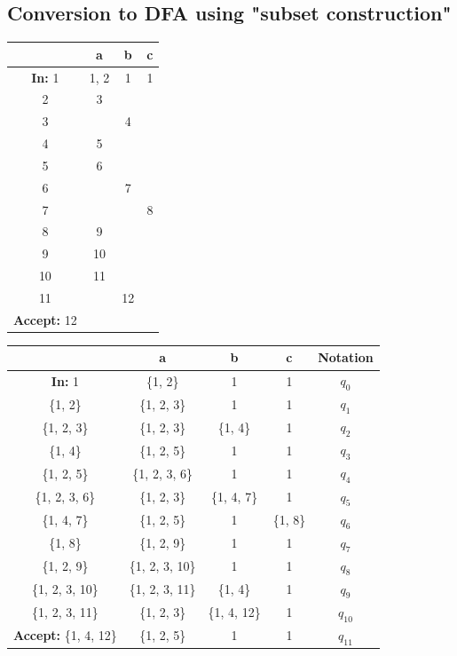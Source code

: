 \documentclass[12pt]{article}
\begin{document}
\subsection{Conversion to DFA using "subset construction"}

\begin{center}
  \begin{tabular}{|c|c|c|c|}
    \hline
     & a & b & c \\
    \hline
    \textbf{In:} 1 & 1, 2 & 1 & 1 \\
    \hline
    2 & 3 &  & \\
    \hline
    3 &  & 4 & \\
    \hline
    4 & 5 &  & \\
    \hline
    5 & 6 &  & \\
    \hline
    6 &  & 7 & \\
    \hline
    7 &  &  & 8 \\
    \hline
    8 & 9 &  & \\
    \hline
    9 & 10 &  & \\
    \hline
    10 & 11 &  & \\
    \hline
    11 &  & 12 & \\
    \hline
    \textbf{Accept:} 12 &  &  & \\
    \hline
  \end{tabular}
\end{center}

\begin{center}
  \begin{tabular}{|c|c|c|c|c|}
    \hline
     & a & b & c & Notation\\
    \hline
    \textbf{In:} 1 & \{1, 2\} & 1 & 1 & $q_0$ \\
    \hline
    \{1, 2\} & \{1, 2, 3\} & 1 & 1 & $q_1$ \\
    \hline
    \{1, 2, 3\} & \{1, 2, 3\} & \{1, 4\} & 1 & $q_2$ \\
    \hline
    \{1, 4\} & \{1, 2, 5\} & 1 & 1 & $q_3$ \\
    \hline
    \{1, 2, 5\} & \{1, 2, 3, 6\} & 1 & 1 & $q_4$ \\
    \hline
    \{1, 2, 3, 6\} & \{1, 2, 3\} & \{1, 4, 7\} & 1 & $q_5$ \\
    \hline
    \{1, 4, 7\} & \{1, 2, 5\} & 1 & \{1, 8\} & $q_6$ \\
    \hline
    \{1, 8\} & \{1, 2, 9\} & 1 & 1 & $q_7$ \\
    \hline
    \{1, 2, 9\} & \{1, 2, 3, 10\} & 1 & 1 & $q_8$ \\
    \hline
    \{1, 2, 3, 10\} & \{1, 2, 3, 11\} & \{1, 4\} & 1 & $q_9$ \\
    \hline
    \{1, 2, 3, 11\} & \{1, 2, 3\} & \{1, 4, 12\} & 1 & $q_{10}$ \\
    \hline
    \textbf{Accept:} \{1, 4, 12\} & \{1, 2, 5\} & 1 & 1 & $q_{11}$ \\
    \hline
  \end{tabular}
\end{center}
\end{document}
